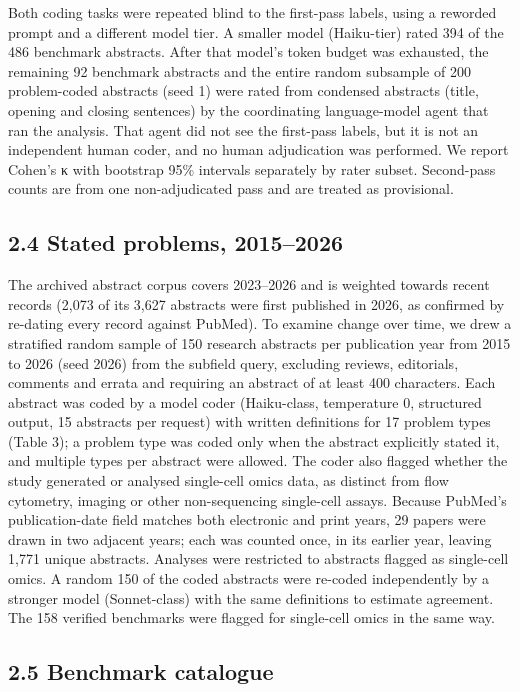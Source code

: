 \documentclass[11pt]{article}
\begin{document}
Both coding tasks were repeated blind to the first-pass labels, using a
reworded prompt and a different model tier. A smaller model (Haiku-tier)
rated 394 of the 486 benchmark abstracts. After that model's token
budget was exhausted, the remaining 92 benchmark abstracts and the
entire random subsample of 200 problem-coded abstracts (seed 1) were
rated from condensed abstracts (title, opening and closing sentences) by
the coordinating language-model agent that ran the analysis. That agent
did not see the first-pass labels, but it is not an independent human
coder, and no human adjudication was performed. We report Cohen's κ with
bootstrap 95\% intervals separately by rater subset. Second-pass counts
are from one non-adjudicated pass and are treated as provisional.

\subsection{2.4 Stated problems, 2015--2026}\label{stated-problems-20152026}

The archived abstract corpus covers 2023--2026 and is weighted towards
recent records (2,073 of its 3,627 abstracts were first published in
2026, as confirmed by re-dating every record against PubMed). To examine
change over time, we drew a stratified random sample of 150 research
abstracts per publication year from 2015 to 2026 (seed 2026) from the
subfield query, excluding reviews, editorials, comments and errata and
requiring an abstract of at least 400 characters. Each abstract was
coded by a model coder (Haiku-class, temperature 0, structured output,
15 abstracts per request) with written definitions for 17 problem types
(Table 3); a problem type was coded only when the abstract explicitly
stated it, and multiple types per abstract were allowed. The coder also
flagged whether the study generated or analysed single-cell omics data,
as distinct from flow cytometry, imaging or other non-sequencing
single-cell assays. Because PubMed's publication-date field matches both
electronic and print years, 29 papers were drawn in two adjacent years;
each was counted once, in its earlier year, leaving 1,771 unique
abstracts. Analyses were restricted to abstracts flagged as single-cell
omics. A random 150 of the coded abstracts were re-coded independently
by a stronger model (Sonnet-class) with the same definitions to estimate
agreement. The 158 verified benchmarks were flagged for single-cell
omics in the same way.

\subsection{2.5 Benchmark catalogue}\label{benchmark-catalogue}
\end{document}
